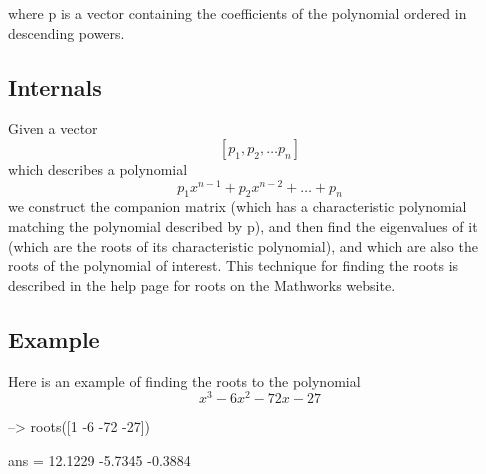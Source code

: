  where {\ttfamily p} is a vector containing the coefficients of the polynomial ordered in descending powers. \hypertarget{transforms_svd_Function}{}\subsection{Internals}\label{transforms_svd_Function}
Given a vector \[ [p_1, p_2, \dots p_n] \] which describes a polynomial \[ p_1 x^{n-1} + p_2 x^{n-2} + \dots + p_n \] we construct the companion matrix (which has a characteristic polynomial matching the polynomial described by {\ttfamily p}), and then find the eigenvalues of it (which are the roots of its characteristic polynomial), and which are also the roots of the polynomial of interest. This technique for finding the roots is described in the help page for {\ttfamily roots} on the Mathworks website. \hypertarget{variables_struct_Example}{}\subsection{Example}\label{variables_struct_Example}
Here is an example of finding the roots to the polynomial \[ x^3 - 6x^2 - 72x - 27 \]


\begin{DoxyVerbInclude}
--> roots([1 -6 -72 -27])

ans = 
   12.1229 
   -5.7345 
   -0.3884 
\end{DoxyVerbInclude}
 